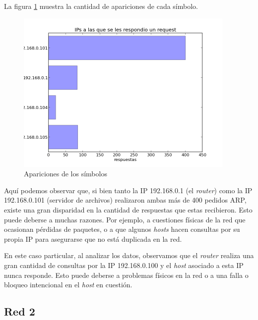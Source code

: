 \documentclass{article}
\begin{document}
La figura \ref{fig:red1replied:count} muestra la cantidad de apariciones de
cada símbolo.

\begin{figure}[h!]
    \centering
    \includegraphics[width=300pt]{red1replied.png}
    \caption{Apariciones de los símbolos}
    \label{fig:red1replied:count}
\end{figure}

Aquí podemos observar que, si bien tanto la IP 192.168.0.1 (el \emph{router})
como la IP 192.168.0.101 (servidor de archivos) realizaron ambas más de 400
pedidos ARP, existe una gran disparidad en la cantidad de respuestas que estas
recibieron. Esto puede deberse a muchas razones. Por ejemplo, a cuestiones
físicas de la red que ocasionan pérdidas de paquetes, o a que algunos
\emph{hosts} hacen consultas por su propia IP para asegurarse que no está
duplicada en la red.

En este caso particular, al analizar los datos, observamos que el
\emph{router} realiza una gran cantidad de consultas por la IP 192.168.0.100 y
el \emph{host} asociado a esta IP nunca responde. Esto puede deberse a
problemas físicos en la red o a una falla o bloqueo intencional en el
\emph{host} en cuestión.



\subsection{Red 2}
\end{document}
